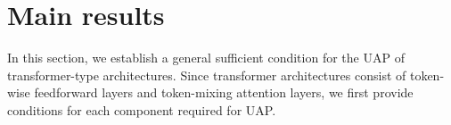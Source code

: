 \documentclass{article}
\begin{document}


\section{Main results}
In this section, we establish a general sufficient condition for the UAP of transformer-type architectures. Since transformer architectures consist of token-wise feedforward layers and token-mixing attention layers, we first provide conditions for each component required for UAP.
\end{document}
